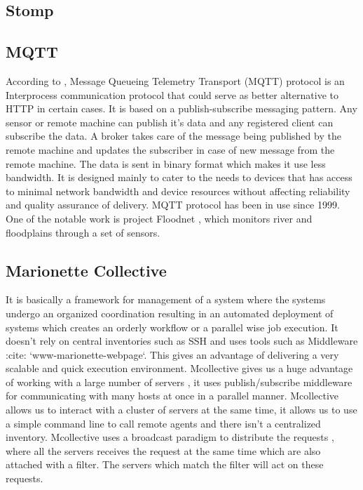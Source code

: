 \subsection{Stomp}
\subsection{MQTT}
     
     According to \cite{www-mqtt}, Message Queueing Telemetry
     Transport (MQTT) protocol is an Interprocess communication
     protocol that could serve as better alternative to HTTP in
     certain cases. It is based on a publish-subscribe messaging
     pattern. Any sensor or remote machine can publish it's data and
     any registered client can subscribe the data. A broker takes care
     of the message being published by the remote machine and updates
     the subscriber in case of new message from the remote
     machine. The data is sent in binary format which makes it use
     less bandwidth. It is designed mainly to cater to the needs to
     devices that has access to minimal network bandwidth and device
     resources without affecting reliability and quality assurance of
     delivery. MQTT protocol has been in use since 1999. One of the
     notable work is project Floodnet \cite{www-floodnet}, which
     monitors river and floodplains through a set of sensors.

\subsection{Marionette Collective}

     It is basically a framework for management of a system where the
     systems undergo an organized coordination resulting in an
     automated deployment of systems which creates an orderly workflow
     or a parallel wise job execution. It doesn’t rely on central
     inventories such as SSH and uses tools such as Middleware :cite:
     `www-marionette-webpage`. This gives an advantage of delivering a
     very scalable and quick execution environment.  Mcollective gives
     us a huge advantage of working with a large number of servers ,
     it uses publish/subscribe middleware for communicating with many
     hosts at once in a parallel manner. Mcollective allows us to
     interact with a cluster of servers at the same time, it allows us
     to use a simple command line to call remote agents and there
     isn’t a centralized inventory. Mcollective uses a broadcast
     paradigm to distribute the requests , where all the servers
     receives the request at the same time which are also attached
     with a filter. The servers which match the filter will act on
     these requests.
     
